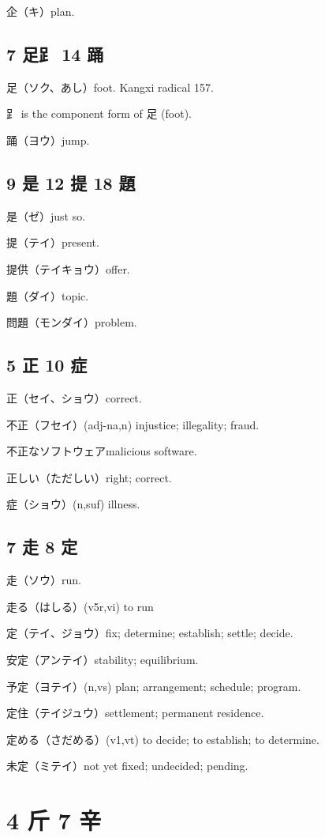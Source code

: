 企（キ）plan.

\subsection{7 足⻊ 14 踊}

足（ソク、あし）foot.
Kangxi radical 157.

⻊ is the component form of 足 (foot).

踊（ヨウ）jump.

\subsection{9 是 12 提 18 題}

是（ゼ）just so.

提（テイ）present.

提供（テイキョウ）offer.

題（ダイ）topic.

問題（モンダイ）problem.

\subsection{5 正 10 症}

正（セイ、ショウ）correct.

不正（フセイ）(adj-na,n) injustice; illegality; fraud.

不正なソフトウェアmalicious software.

正しい（ただしい）right; correct.

症（ショウ）(n,suf) illness.

\subsection{7 走 8 定}

走（ソウ）run.

走る（はしる）(v5r,vi) to run

定（テイ、ジョウ）fix; determine; establish; settle; decide.

安定（アンテイ）stability; equilibrium.

予定（ヨテイ）(n,vs) plan; arrangement; schedule; program.

定住（テイジュウ）settlement; permanent residence.

定める（さだめる）(v1,vt) to decide; to establish; to determine.

未定（ミテイ）not yet fixed; undecided; pending.

\section{4 斤 7 辛}


